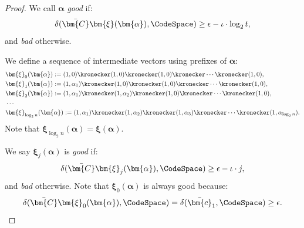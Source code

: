 \begin{proof}
We call $\bm{\alpha}$ \emph{good} if:
\[
    \delta(\bar{\bm{C}} \bm{\xi}(\bm{\alpha}), \CodeSpace) \ge \epsilon - \iota \cdot \log_2 t,
\]
and \emph{bad} otherwise.

We define a sequence of intermediate vectors using prefixes of $\bm{\alpha}$:
\begin{align*}
&
    \bm{\xi}_0(\bm{\alpha}) := (1, 0) \kronecker (1,0) \kronecker (1,0)\kronecker \cdots \kronecker (1, 0),
\\
&
    \bm{\xi}_1(\bm{\alpha}) := (1, \alpha_1) \kronecker (1,0) \kronecker (1,0)\kronecker \cdots \kronecker (1, 0),
\\
&
    \bm{\xi}_2(\bm{\alpha}) := (1, \alpha_1) \kronecker (1,\alpha_2) \kronecker (1,0) \kronecker \cdots \kronecker (1, 0),
\\
&
    \cdots
\\
&
    \bm{\xi}_{\log_2 n}(\bm{\alpha}) := (1, \alpha_1) \kronecker (1,\alpha_2) \kronecker (1,\alpha_3) \kronecker \cdots \kronecker (1, \alpha_{\log_2 n}).
\end{align*}
Note that $\bm{\xi}_{\log_2 n}(\bm{\alpha})= \bm{\xi}(\bm{\alpha})$.

We say $\bm{\xi}_j(\bm{\alpha})$ is \emph{good} if:
\[
    \delta(\bar{\bm{C}} \bm{\xi}_j(\bm{\alpha}), \CodeSpace) \ge \epsilon - \iota \cdot j,
\]
and \emph{bad} otherwise.
Note that $\bm{\xi}_0(\bm{\alpha})$ is always good because:
\[
    \delta(\bar{\bm{C}} \bm{\xi}_0(\bm{\alpha}), \CodeSpace) = \delta(\bar{\bm{c}}_1, \CodeSpace) \ge \epsilon.
\]



\end{proof}
